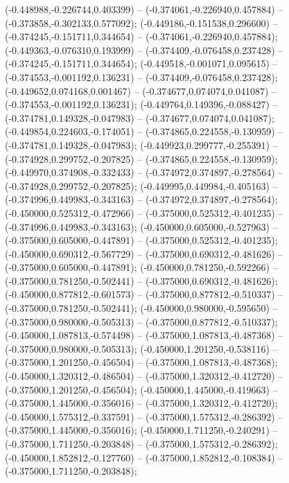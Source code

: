  (-0.448988,-0.226744,0.403399) -- (-0.374061,-0.226940,0.457884) -- (-0.373858,-0.302133,0.577092);
 (-0.449186,-0.151538,0.296600) -- (-0.374245,-0.151711,0.344654) -- (-0.374061,-0.226940,0.457884);
 (-0.449363,-0.076310,0.193999) -- (-0.374409,-0.076458,0.237428) -- (-0.374245,-0.151711,0.344654);
 (-0.449518,-0.001071,0.095615) -- (-0.374553,-0.001192,0.136231) -- (-0.374409,-0.076458,0.237428);
 (-0.449652,0.074168,0.001467) -- (-0.374677,0.074074,0.041087) -- (-0.374553,-0.001192,0.136231);
 (-0.449764,0.149396,-0.088427) -- (-0.374781,0.149328,-0.047983) -- (-0.374677,0.074074,0.041087);
 (-0.449854,0.224603,-0.174051) -- (-0.374865,0.224558,-0.130959) -- (-0.374781,0.149328,-0.047983);
 (-0.449923,0.299777,-0.255391) -- (-0.374928,0.299752,-0.207825) -- (-0.374865,0.224558,-0.130959);
 (-0.449970,0.374908,-0.332433) -- (-0.374972,0.374897,-0.278564) -- (-0.374928,0.299752,-0.207825);
 (-0.449995,0.449984,-0.405163) -- (-0.374996,0.449983,-0.343163) -- (-0.374972,0.374897,-0.278564);
 (-0.450000,0.525312,-0.472966) -- (-0.375000,0.525312,-0.401235) -- (-0.374996,0.449983,-0.343163);
 (-0.450000,0.605000,-0.527963) -- (-0.375000,0.605000,-0.447891) -- (-0.375000,0.525312,-0.401235);
 (-0.450000,0.690312,-0.567729) -- (-0.375000,0.690312,-0.481626) -- (-0.375000,0.605000,-0.447891);
 (-0.450000,0.781250,-0.592266) -- (-0.375000,0.781250,-0.502441) -- (-0.375000,0.690312,-0.481626);
 (-0.450000,0.877812,-0.601573) -- (-0.375000,0.877812,-0.510337) -- (-0.375000,0.781250,-0.502441);
 (-0.450000,0.980000,-0.595650) -- (-0.375000,0.980000,-0.505313) -- (-0.375000,0.877812,-0.510337);
 (-0.450000,1.087813,-0.574498) -- (-0.375000,1.087813,-0.487368) -- (-0.375000,0.980000,-0.505313);
 (-0.450000,1.201250,-0.538116) -- (-0.375000,1.201250,-0.456504) -- (-0.375000,1.087813,-0.487368);
 (-0.450000,1.320312,-0.486504) -- (-0.375000,1.320312,-0.412720) -- (-0.375000,1.201250,-0.456504);
 (-0.450000,1.445000,-0.419663) -- (-0.375000,1.445000,-0.356016) -- (-0.375000,1.320312,-0.412720);
 (-0.450000,1.575312,-0.337591) -- (-0.375000,1.575312,-0.286392) -- (-0.375000,1.445000,-0.356016);
 (-0.450000,1.711250,-0.240291) -- (-0.375000,1.711250,-0.203848) -- (-0.375000,1.575312,-0.286392);
 (-0.450000,1.852812,-0.127760) -- (-0.375000,1.852812,-0.108384) -- (-0.375000,1.711250,-0.203848);
